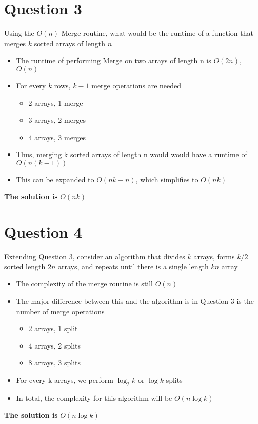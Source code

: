 \documentclass{article}
\begin{document}
    \section{Question 3}
    Using the $O(n)$ Merge routine, what would be the runtime of a function that merges $k$ sorted arrays of length $n$
        \begin{itemize}
            \item{The runtime of performing Merge on two arrays of length n is $O(2n)$, $O(n)$}
            \item{For every $k$ rows, $k - 1$ merge operations are needed}
                \begin{itemize}
                    \item{2 arrays, 1 merge}
                    \item{3 arrays, 2 merges}
                    \item{4 arrays, 3 merges}
                \end{itemize}
            \item{Thus, merging k sorted arrays of length n would would have a runtime of $O(n(k-1))$}
            \item{This can be expanded to $O(nk - n)$, which simplifies to $O(nk)$}
        \end{itemize}
    \textbf{The solution is} $O(nk)$

    \section{Question 4}
    Extending Question 3, consider an algorithm that divides $k$ arrays, forms $k/2$ sorted length $2n$ arrays,
    and repeats until there is a single length $kn$ array
        \begin{itemize}
            \item{The complexity of the merge routine is still $O(n)$}
            \item{The major difference between this and the algorithm is in Question 3 is the number of merge operations}
                \begin{itemize}
                  \item{2 arrays, 1 split}
                  \item{4 arrays, 2 splits}
                  \item{8 arrays, 3 splits}
                \end{itemize}
            \item{For every k arrays, we perform $\log_2 k$ or $\log k$ splits}
            \item{In total, the complexity for this algorithm will be $O(n\log k)$}
        \end{itemize}
    \textbf{The solution is} $O(n\log k)$
\end{document}
